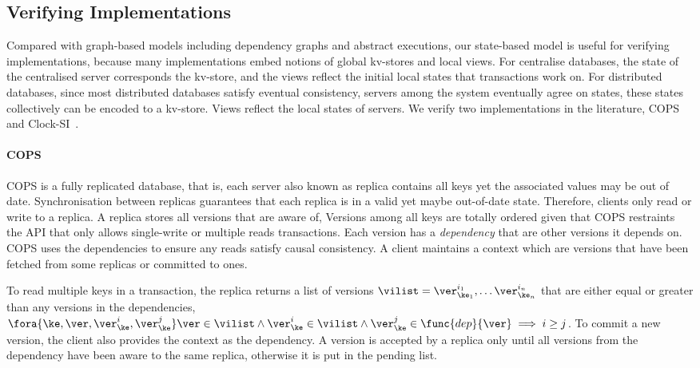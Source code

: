 \subsection{Verifying Implementations}
\label{sec:verify-impl}
Compared with graph-based models including dependency graphs and abstract executions,
our state-based model is useful for verifying implementations,
because many implementations embed notions of global kv-stores and local views.
For centralise databases, the state of the centralised server corresponds the kv-store,
and the views reflect the initial local states that transactions work on.
For distributed databases, since most distributed databases satisfy eventual consistency, 
\ie servers among the system eventually agree on states,
these states collectively can be encoded to a kv-store.
Views reflect the local states of servers.
We verify two implementations in the literature, 
COPS~\cite{Lloyd:2011:DSE:2043556.2043593} and Clock-SI~\cite{Du:2013:CSI:2553409.2553434}.

\paragraph{\bf COPS}
COPS is a fully replicated database, that is, 
each server also known as replica contains all keys yet the associated values may be out of date.
Synchronisation between replicas guarantees that each replica is in a valid yet maybe out-of-date state.
Therefore, clients only read or write to a replica.
A replica stores all versions that are aware of,
Versions among all keys are totally ordered given that
COPS restraints the API that only allows single-write or multiple reads transactions.
Each version has a \emph{dependency} that are other versions it depends on.
COPS uses the dependencies to ensure any reads satisfy causal consistency.
A client maintains a context which are versions 
that have been fetched from some replicas or committed to ones.

To read multiple keys in a transaction, the replica returns a list of versions \( \vilist = \ver^{i_1}_{\ke_1}, \dots \ver^{i_n}_{\ke_n} \) 
that are either equal or greater than any versions in the dependencies,
\ie \( \fora{\ke, \ver, \ver^{i}_{\ke}, \ver^{j}_{\ke}} \ver \in \vilist \land \ver^{i}_{\ke} \in \vilist \land \ver^{j}_{\ke} \in \func{dep}{\ver} \implies i \geq j \).
To commit a new version, the client also provides the context as the dependency.
A version is accepted by a replica
only until all versions from the dependency have been aware to the same replica,
otherwise it is put in the pending list.

